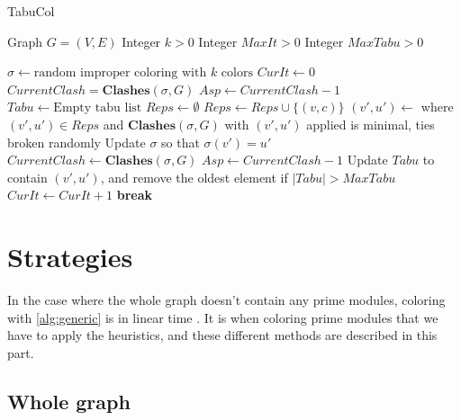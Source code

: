\documentclass[a4paper]{article}
\newcommand{\algorithmicbreak}{\textbf{break}}
\newcommand{\BREAK}{\STATE \algorithmicbreak}
\begin{document}
\begin{algorithm}[H]
    \caption{TabuCol}
    \begin{algorithmic}[1]
        \REQUIRE Graph $G = (V,E)$
        \REQUIRE Integer $k > 0$
        \REQUIRE Integer $MaxIt > 0$
        \REQUIRE Integer $MaxTabu > 0$
      
        \STATE $\sigma \leftarrow \text{random improper coloring with $k$ colors}$
        \STATE $CurIt \leftarrow 0$
        \STATE $CurrentClash = \textbf{Clashes}(\sigma,G)$
        \STATE $Asp \leftarrow CurrentClash-1$
        \STATE $Tabu \leftarrow \text{Empty tabu list}$
            \STATE $Reps \leftarrow \emptyset$
                        \STATE $Reps \leftarrow Reps \cup \{(v,c)\}$
                    \ENDIF
                \ENDFOR
            \ENDFOR
            \STATE $(v',u') \leftarrow $ where $(v',u') \in Reps$ and $\textbf{Clashes}(\sigma,G)$ with $(v',u')$ applied is minimal, ties broken randomly
            \STATE Update $\sigma$ so that $\sigma(v') = u'$
            \STATE $CurrentClash \leftarrow \textbf{Clashes}(\sigma,G)$
                \STATE $Asp \leftarrow CurrentClash -1$
            \ENDIF
            \STATE Update $Tabu$ to contain $(v',u')$, and remove the oldest element if $|Tabu| > MaxTabu$
            \STATE $CurIt \leftarrow CurIt + 1$
                \BREAK
            \ENDIF
        \ENDWHILE
    \end{algorithmic}
\end{algorithm}


\section{Strategies}
\label{sec:Strategies}
In the case where the whole graph doesn't contain any prime modules, coloring
with \autoref{alg:generic} is in linear time \cite{MDLinear}. It is when coloring prime modules
that we have to apply the heuristics, and these different methods are
described in this part.

\subsection{Whole graph}
\end{document}
